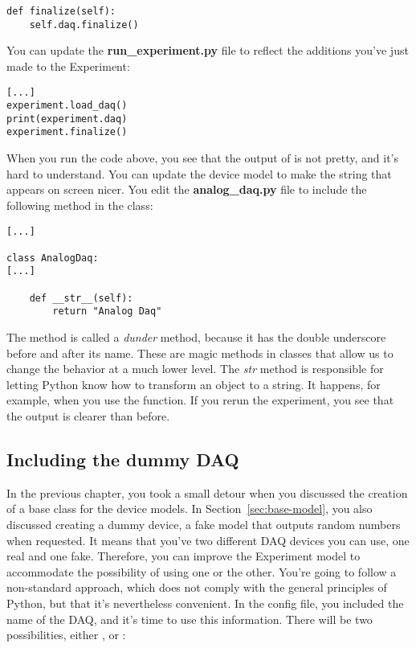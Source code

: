 \begin{verbatim}
def finalize(self):
    self.daq.finalize()
\end{verbatim}

You can update the \textbf{run\_experiment.py} file to reflect the additions you've just made to the Experiment:

\begin{verbatim}
[...]
experiment.load_daq()
print(experiment.daq)
experiment.finalize()
\end{verbatim}

When you run the code above, you see that the output of  is not pretty, and it's hard to understand. You can update the device model to make the string that appears on screen nicer. You edit the \textbf{analog\_daq.py} file to include the following method in the  class:

\begin{verbatim}
[...]

class AnalogDaq:
[...]

    def __str__(self):
        return "Analog Daq"
\end{verbatim}

The method  is called a \emph{dunder} method, because it has the double underscore before and after its name. These are magic methods in classes that allow us to change the behavior at a much lower level. The \emph{str} method is responsible for letting Python know how to transform an object to a string. It happens, for example, when you use the  function. If you rerun the experiment, you see that the output is clearer than before.


\subsection{Including the dummy DAQ}\label{subsec:loading-dummy-daq}
In the previous chapter, you took a small detour when you discussed the creation of a base class for the device models. In Section~\ref{sec:base-model}, you also discussed creating a dummy device, a fake model that outputs random numbers when requested. It means that you've two different DAQ devices you can use, one real and one fake. Therefore, you can improve the Experiment model to accommodate the possibility of using one or the other. You're going to follow a non-standard approach, which does not comply with the general principles of Python, but that it's nevertheless convenient. In the config file, you included the name of the DAQ, and it's time to use this information. There will be two possibilities, either , or :

